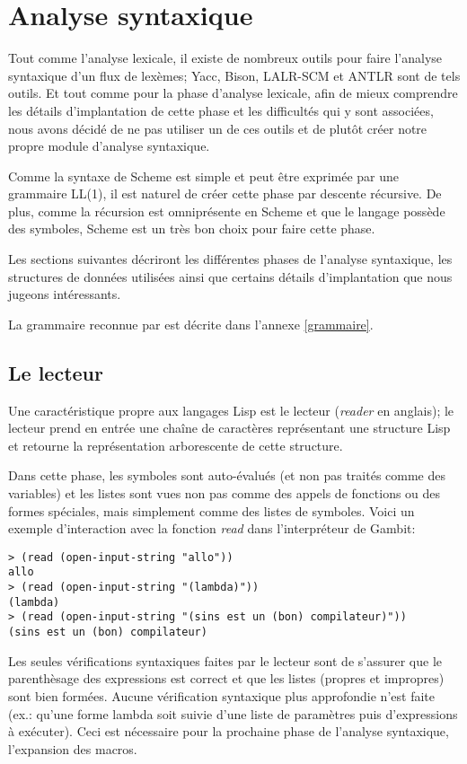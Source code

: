 \documentclass[11pt]{report}
\begin{document}
\chapter{Analyse syntaxique}

Tout comme l'analyse lexicale, il existe de nombreux outils pour faire
l'analyse syntaxique d'un flux de lexèmes; Yacc, Bison, LALR-SCM et
ANTLR sont de tels outils.  Et tout comme pour la phase d'analyse
lexicale, afin de mieux comprendre les détails d'implantation de cette
phase et les difficultés qui y sont associées, nous avons décidé de ne
pas utiliser un de ces outils et de plutôt créer notre propre module
d'analyse syntaxique.

Comme la syntaxe de Scheme est simple et peut être exprimée par une
grammaire LL(1), il est naturel de créer cette phase par descente
récursive.  De plus, comme la récursion est omniprésente en Scheme et
que le langage possède des symboles, Scheme est un très bon choix pour
faire cette phase.

Les sections suivantes décriront les différentes phases de l'analyse
syntaxique, les structures de données utilisées ainsi que certains
détails d'implantation que nous jugeons intéressants.

La grammaire reconnue par \sins{} est décrite dans l'annexe
\ref{grammaire}.


\section{Le lecteur}

Une caractéristique propre aux langages Lisp est le lecteur
(\emph{reader} en anglais); le lecteur prend en entrée une chaîne de
caractères représentant une structure Lisp et retourne la
représentation arborescente de cette structure.

Dans cette phase, les symboles sont auto-évalués (et non pas traités
comme des variables) et les listes sont vues non pas comme des appels
de fonctions ou des formes spéciales, mais simplement comme des listes
de symboles.  Voici un exemple d'interaction avec la fonction
\emph{read} dans l'interpréteur de Gambit:

\begin{verbatim}
> (read (open-input-string "allo"))
allo
> (read (open-input-string "(lambda)"))
(lambda)
> (read (open-input-string "(sins est un (bon) compilateur)"))
(sins est un (bon) compilateur)
\end{verbatim}

Les seules vérifications syntaxiques faites par le lecteur sont de s'assurer
que le parenthèsage des expressions est correct et que les listes (propres et
impropres) sont bien formées.  Aucune vérification syntaxique plus approfondie
n'est faite (ex.: qu'une forme lambda soit suivie d'une liste de paramètres
puis d'expressions à exécuter).  Ceci est nécessaire pour la prochaine phase
de l'analyse syntaxique, l'expansion des macros.
\end{document}
